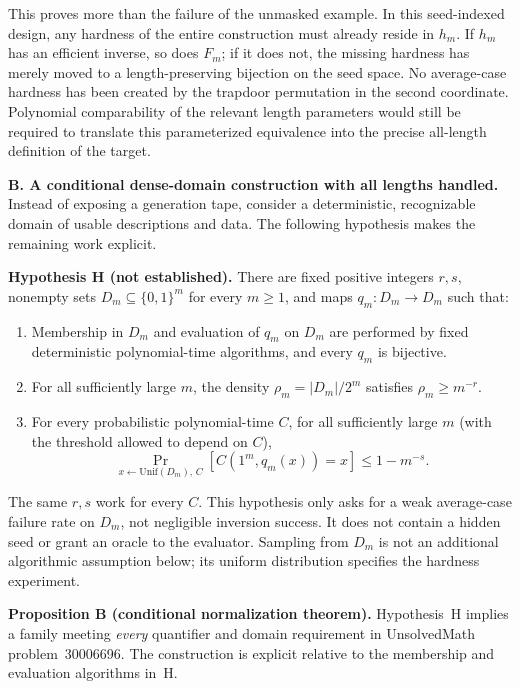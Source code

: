 \documentclass[11pt,a4paper]{article}
\numberwithin{equation}{section}
\begin{document}
This proves more than the failure of the unmasked example. In this
seed-indexed design, any hardness of the entire construction must
already reside in $h_m$. If $h_m$ has an efficient inverse, so does
$F_m$; if it does not, the missing hardness has merely moved to a
length-preserving bijection on the seed space. No average-case hardness
has been created by the trapdoor permutation in the second coordinate.
Polynomial comparability of the relevant length parameters would still
be required to translate this parameterized equivalence into the precise
all-length definition of the target.

\medskip{}
\textbf{B. A conditional dense-domain construction with all lengths handled.}
Instead of exposing a generation tape, consider a deterministic,
recognizable domain of usable descriptions and data. The following
hypothesis makes the remaining work explicit.

\textbf{Hypothesis H (not established).}
There are fixed positive integers $r,s$, nonempty sets
$D_m\subseteq\{0,1\}^m$ for every $m\ge1$, and maps
$q_m:D_m\to D_m$ such that:
\begin{enumerate}[label=(\roman*),leftmargin=2.8em,itemsep=3pt]
\item Membership in $D_m$ and evaluation of $q_m$ on $D_m$ are performed
by fixed deterministic polynomial-time algorithms, and every $q_m$ is
bijective.
\item For all sufficiently large $m$, the density
$\rho_m=|D_m|/2^m$ satisfies $\rho_m\ge m^{-r}$.
\item For every probabilistic polynomial-time $C$, for all sufficiently
large $m$ (with the threshold allowed to depend on $C$),
\begin{equation}\label{eq:30006696:H}
 \Pr_{x\leftarrow\mathrm{Unif}(D_m),\,C}
       [C(1^m,q_m(x))=x]\le 1-m^{-s}.
\end{equation}
\end{enumerate}
The same $r,s$ work for every $C$. This hypothesis only asks for a weak
average-case failure rate on $D_m$, not negligible inversion success.
It does not contain a hidden seed or grant an oracle to the evaluator.
Sampling from $D_m$ is not an additional algorithmic assumption below;
its uniform distribution specifies the hardness experiment.

\textbf{Proposition B (conditional normalization theorem).}
Hypothesis~H implies a family meeting \emph{every} quantifier and domain
requirement in UnsolvedMath problem~30006696. The construction is explicit relative to the
membership and evaluation algorithms in~H.
\end{document}
